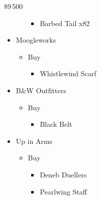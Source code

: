 \begin{shop}{89\,500}
\begin{itemize}
\begin{itemize}
\begin{itemize}
						\item Barbed Tail x82
					\end{itemize}
			\end{itemize}
		\item Moogleworks
			\begin{itemize}
				\item Buy
					\begin{itemize}
						\item Whistlewind Scarf
					\end{itemize}
			\end{itemize}
		\item B\&W Outfitters
			\begin{itemize}
				\item Buy
					\begin{itemize}
						\item Black Belt
					\end{itemize}
			\end{itemize}
		\item Up in Arms
			\begin{itemize}
				\item Buy
					\begin{itemize}
						\item Deneb Duellers
						\item Pearlwing Staff
					\end{itemize}
			\end{itemize}
	\end{itemize}
\end{shop}

